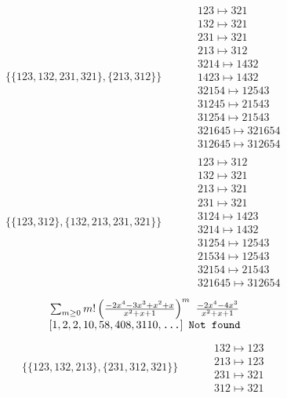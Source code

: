 \begin{tiny}
\begin{align}
\{\{123, 132, 231, 321\}, \{213, 312\}\}
\quad
&
\phantom{.}
&
\begin{matrix}
123 \mapsto 321\\132 \mapsto 321\\231 \mapsto 321\\213 \mapsto 312\\3214 \mapsto 1432\\1423 \mapsto 1432\\32154 \mapsto 12543\\31245 \mapsto 21543\\31254 \mapsto 21543\\321645 \mapsto 321654\\312645 \mapsto 312654
\end{matrix}
\\
\{\{123, 312\}, \{132, 213, 231, 321\}\}
\quad
&
\phantom{.}
&
\begin{matrix}
123 \mapsto 312\\132 \mapsto 321\\213 \mapsto 321\\231 \mapsto 321\\3124 \mapsto 1423\\3214 \mapsto 1432\\31254 \mapsto 12543\\21534 \mapsto 12543\\32154 \mapsto 21543\\321645 \mapsto 312654
\end{matrix}
\end{align}
$$
\begin{matrix}
\sum_{m \geq 0} m! \left(
\frac{-2 x^{4} - 3 x^{3} + x^{2} + x}{x^{2} + x + 1}
\right)^m
\ 
\frac{-2 x^{4} - 4 x^{3}}{x^{2} + x + 1}
\\
\left[1, 2, 2, 10, 58, 408, 3110, \text{\texttt{...}}\right]
\ 
\texttt{Not found}
\end{matrix}
$$
\vspace{-1em}
\begin{align}
\{\{123, 132, 213\}, \{231, 312, 321\}\}
\quad
&
\phantom{.}
&
\begin{matrix}
132 \mapsto 123\\213 \mapsto 123\\231 \mapsto 321\\312 \mapsto 321
\end{matrix}
\end{align}
\end{tiny}

